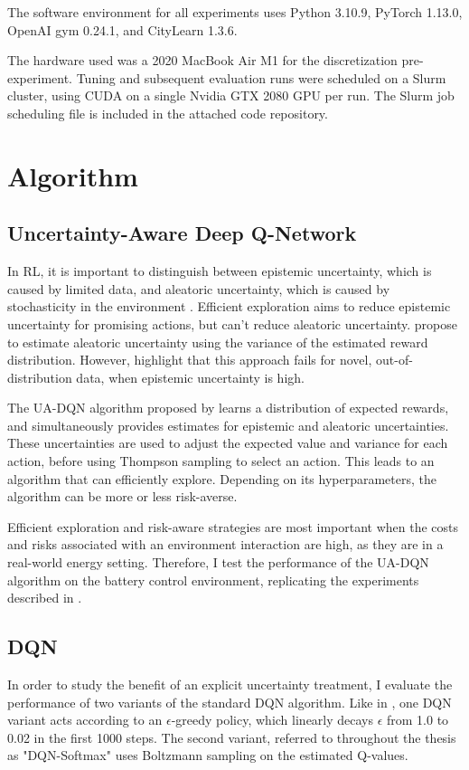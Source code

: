 The software environment for all experiments uses Python 3.10.9, PyTorch 1.13.0, OpenAI gym 0.24.1, and CityLearn 1.3.6.

The hardware used was a 2020 MacBook Air M1 for the discretization pre-experiment. Tuning and subsequent evaluation runs were scheduled on a Slurm cluster, using CUDA on a single Nvidia GTX 2080 GPU per run. The Slurm job scheduling file is included in the attached code repository.


\section{Algorithm}
\subsection{Uncertainty-Aware Deep Q-Network} %
In RL, it is important to distinguish between epistemic uncertainty, which is caused by limited data, and aleatoric uncertainty, which is caused by stochasticity in the environment \citep{hullermeier2021AleatoricEpistemicUncertainty}.
Efficient exploration aims to reduce epistemic uncertainty for promising actions, but can't reduce aleatoric uncertainty.
\cite{nikolov2022InformationDirectedExplorationDeep} propose to estimate aleatoric uncertainty using the variance of the estimated reward distribution.
However, \cite{chua2018DeepReinforcementLearning} highlight that this approach fails for novel, out-of-distribution data, when epistemic uncertainty is high.

The UA-DQN algorithm proposed by \cite{clements2020EstimatingRiskUncertainty} learns a distribution of expected rewards, and simultaneously provides estimates for epistemic and aleatoric uncertainties.
These uncertainties are used to adjust the expected value and variance for each action, before using Thompson sampling to select an action.
This leads to an algorithm that can efficiently explore.
Depending on its hyperparameters, the algorithm can be more or less risk-averse.

Efficient exploration and risk-aware strategies are most important when the costs and risks associated with an environment interaction are high, as they are in a real-world energy setting.
Therefore, I test the performance of the UA-DQN algorithm on the battery control environment, replicating the experiments described in \cite{clements2020EstimatingRiskUncertainty}.

\subsection{DQN}
In order to study the benefit of an explicit uncertainty treatment, I evaluate the performance of two variants of the standard DQN algorithm.
Like in \cite{clements2020EstimatingRiskUncertainty}, one DQN variant acts according to an $\epsilon$-greedy policy, which linearly decays $\epsilon$ from 1.0 to 0.02 in the first 1000 steps.
The second variant, referred to throughout the thesis as "DQN-Softmax" uses Boltzmann sampling on the estimated Q-values.

